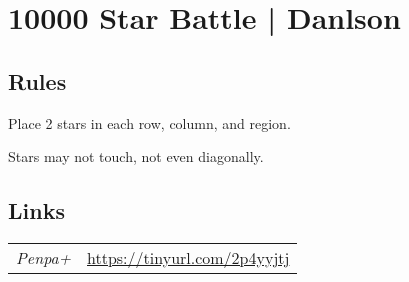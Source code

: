 \section[10000 Star Battle | Danlson {[\emph{Star Battle (2*)}]}]{10000 Star Battle | {\normalfont Danlson}}
\label{sec:32-10000-star-battle-danlson}

\subsection*{Rules}
\begin{markdown}
Place 2 stars in each row, column, and region.

Stars may not touch, not even diagonally.
\end{markdown}
\subsection*{Links}
\begin{tabularx}{\textwidth}{l X}
\emph{Penpa+} & \url{https://tinyurl.com/2p4yyjtj} \\
\end{tabularx}
\pagebreak
